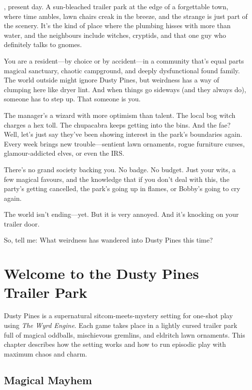 \begin{WyrdSettingHeading}
    , present day. A sun-bleached trailer park at the edge of a forgettable town, where time ambles, lawn chairs creak in the breeze, and the strange is just part of the scenery. It’s the kind of place where the plumbing hisses with more than water, and the neighbours include witches, cryptids, and that one guy who definitely talks to gnomes.

    You are a resident—by choice or by accident—in a community that’s equal parts magical sanctuary, chaotic campground, and deeply dysfunctional found family. The world outside might ignore Dusty Pines, but weirdness has a way of clumping here like dryer lint. And when things go sideways (and they always do), someone has to step up. That someone is you.

    The manager’s a wizard with more optimism than talent. The local bog witch charges a hex toll. The chupacabra keeps getting into the bins. And the fae? Well, let’s just say they’ve been showing interest in the park’s boundaries again. Every week brings new trouble—sentient lawn ornaments, rogue furniture curses, glamour-addicted elves, or even the IRS.

    There’s no grand society backing you. No badge. No budget. Just your wits, a few magical favours, and the knowledge that if you don’t deal with this, the party’s getting cancelled, the park’s going up in flames, or Bobby’s going to cry again.

    The world isn’t ending—yet. But it is very annoyed. And it’s knocking on your trailer door.

    So, tell me: What weirdness has wandered into Dusty Pines this time?
\end{WyrdSettingHeading}

\section[Welcome to the Dusty Pines Trailer Park]{Welcome to the Dusty Pines Trailer Park}

Dusty Pines is a supernatural sitcom-meets-mystery setting for one-shot play using \textit{The Wyrd Engine}. Each game takes place in a lightly cursed trailer park full of magical oddballs, mischievous gremlins, and eldritch lawn ornaments. This chapter describes how the setting works and how to run episodic play with maximum chaos and charm.

\subsection{Magical Mayhem}

